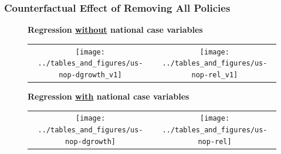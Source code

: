 \documentclass{beamer}
\begin{document}
\begin{frame}
  \frametitle{Counterfactual Effect of Removing All Policies }


\begin{figure}[ht]
\textbf{Regression \underline{without} national case variables }
  \begin{minipage}{\linewidth}
    \centering
    \begin{tabular}{cc}
    \texttt{[image: ../tables\_and\_figures/us-nop-dgrowth\_v1]}
    &
      \texttt{[image: ../tables\_and\_figures/us-nop-rel\_v1]}
    \end{tabular}
  \end{minipage}
\end{figure} \vspace{-0.2cm}
\begin{figure}[ht]
\textbf{Regression \underline{with} national case variables }
  \begin{minipage}{\linewidth}
    \centering
    \begin{tabular}{cc}
      \texttt{[image: ../tables\_and\_figures/us-nop-dgrowth]}
      &
        \texttt{[image: ../tables\_and\_figures/us-nop-rel]} 
    \end{tabular}
  \end{minipage}
\end{figure}

\end{frame}


\end{document}
